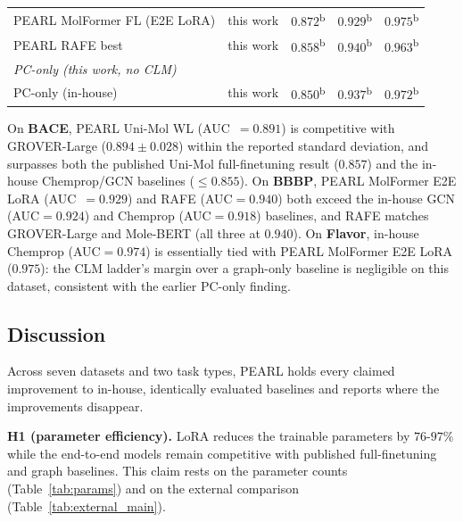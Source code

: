 \documentclass[pdflatex,sn-mathphys-num]{sn-jnl}%
\begin{document}
\begin{table}[!ht]
{\begin{tabular}{llccc}
PEARL MolFormer FL (E2E LoRA) & this work & $0.872$\textsuperscript{b}          & $0.929$\textsuperscript{b} & $\mathbf{0.975}$\textsuperscript{b} \\
PEARL RAFE best               & this work & $0.858$\textsuperscript{b}          & $\mathbf{0.940}$\textsuperscript{b}          & $0.963$\textsuperscript{b} \\
\midrule
\multicolumn{5}{l}{\textit{PC-only (this work, no CLM)}} \\[2pt]
PC-only (in-house)     & this work & $0.850$\textsuperscript{b}          & $0.937$\textsuperscript{b}          & $0.972$\textsuperscript{b} \\
\bottomrule
\end{tabular}
}
\end{table}

On \textbf{BACE}, PEARL Uni-Mol WL (AUC~$=0.891$) is competitive with GROVER-Large ($0.894\pm0.028$) within the reported standard deviation, and surpasses both the published Uni-Mol full-finetuning result ($0.857$) and the in-house Chemprop/GCN baselines ($\le0.855$). On \textbf{BBBP}, PEARL MolFormer E2E LoRA (AUC~$=0.929$) and RAFE (AUC$=0.940$) both exceed the in-house GCN (AUC$=0.924$) and Chemprop (AUC$=0.918$) baselines, and RAFE matches GROVER-Large and Mole-BERT (all three at $0.940$). On \textbf{Flavor}, in-house Chemprop (AUC$=0.974$) is essentially tied with PEARL MolFormer E2E LoRA ($0.975$): the CLM ladder's margin over a graph-only baseline is negligible on this dataset, consistent with the earlier PC-only finding.

\subsection{Discussion}\label{sec:bace_discussion}
Across seven datasets and two task types, PEARL holds every claimed improvement to in-house, identically evaluated baselines and reports where the improvements disappear.

\textbf{H1 (parameter efficiency).} LoRA reduces the trainable parameters by $76$-$97\%$ while the end-to-end models remain competitive with published full-finetuning and graph baselines. This claim rests on the parameter counts (Table~\ref{tab:params}) and on the external comparison (Table~\ref{tab:external_main}).
\end{document}
